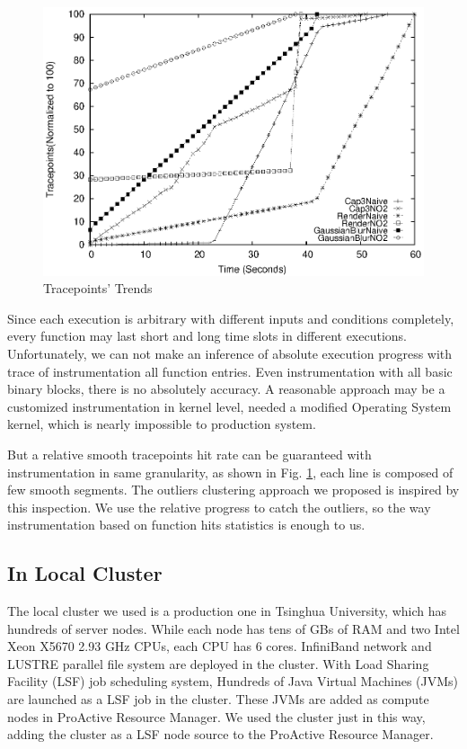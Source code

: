 \begin{figure}
\centering
\includegraphics[width=0.9\columnwidth]{figures/tracepoints_all_vs_sampling.eps}
\caption{Tracepoints' Trends}
\label{figure:tracepoints}
\end{figure}

Since each execution is arbitrary with different inputs and conditions completely, every function may last short and long time slots in different executions. Unfortunately, we can not make an inference of absolute execution progress with  trace of instrumentation all function entries. Even instrumentation with all basic binary blocks, there is no absolutely accuracy. A reasonable approach may be a customized instrumentation in kernel level, needed a modified Operating System kernel, which is nearly impossible to production system.

But a relative smooth tracepoints hit rate can be guaranteed with instrumentation in same granularity, as shown in Fig.  \ref{figure:tracepoints}, each line is composed of few smooth segments. The outliers clustering approach we proposed is inspired by this inspection. We use the relative progress to catch the outliers, so the way instrumentation based on function hits statistics is enough to us.

\subsection{In Local Cluster}

The local cluster we used is a production one in Tsinghua University, which has hundreds of  server nodes. While each node has tens of GBs of RAM and two Intel Xeon X5670 2.93 GHz CPUs, each CPU has 6 cores. InfiniBand network and LUSTRE parallel file system are deployed in the cluster. With Load Sharing Facility (LSF) job scheduling system, Hundreds of Java Virtual Machines (JVMs) are launched as a LSF job in the cluster. These JVMs are added as compute nodes in ProActive Resource Manager. We used the cluster just in this way, adding the cluster as a LSF node source to the ProActive Resource Manager.

